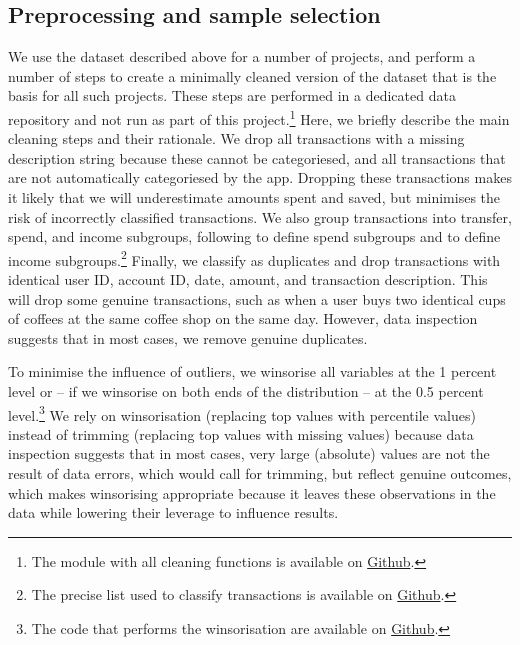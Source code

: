 \subsection{Preprocessing and sample selection}%
\label{par:preprocessing_and_sample_selection}

We use the dataset described above for a number of projects, and perform a
number of steps to create a minimally cleaned version of the dataset that is
the basis for all such projects. These steps are performed in a dedicated data
repository and not run as part of this project.\footnote{The module with all
cleaning functions is available on
\href{https://github.com/fabiangunzinger/entropy/blob/27a210e2f42dfe23a867dbc20c8ef3253d050aaa/src/data/clean.py}{Github}.}
Here, we briefly describe the main cleaning steps and their rationale. We drop
all transactions with a missing description string because these cannot be
categoriesed, and all transactions that are not automatically categoriesed by
the app. Dropping these transactions makes it likely that we will underestimate
amounts spent and saved, but minimises the risk of incorrectly classified
transactions. We also group transactions into transfer, spend, and income
subgroups, following \citet{muggleton2020evidence} to define spend subgroups
and \citet{hacioglu2021distributional} to define income subgroups.\footnote{
The precise list used to classify transactions is available on
\href{https://github.com/fabiangunzinger/entropy/blob/27a210e2f42dfe23a867dbc20c8ef3253d050aaa/src/data/txn_classifications.py}{Github}.}
Finally, we classify as duplicates and drop transactions with identical user ID,
account ID, date, amount, and transaction description. This will drop some
genuine transactions, such as when a user buys two identical cups of coffees at
the same coffee shop on the same day. However, data inspection suggests that in
most cases, we remove genuine duplicates.

To minimise the influence of outliers, we winsorise all variables at the 1
percent level or -- if we winsorise on both ends of the distribution -- at the
0.5 percent level.\footnote{The code that performs the winsorisation are
    available on
\href{https://github.com/fabiangunzinger/entropy/blob/27a210e2f42dfe23a867dbc20c8ef3253d050aaa/src/data/transformers.py}{Github}.}
We rely on winsorisation (replacing top values with percentile values) instead
of trimming (replacing top values with missing values) because data inspection
suggests that in most cases, very large (absolute) values are not the result of
data errors, which would call for trimming, but reflect genuine outcomes, which
makes winsorising appropriate because it leaves these observations in the data
while lowering their leverage to influence results.

